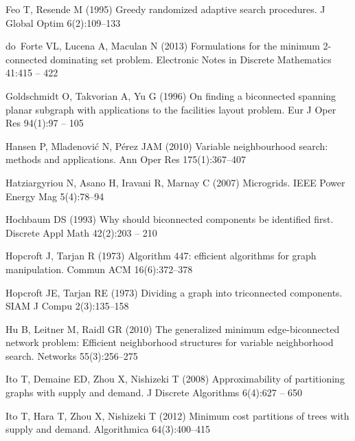 \begin{thebibliography}{38}
Feo T, Resende M (1995) Greedy randomized adaptive search procedures. J Global
  Optim 6(2):109--133

do~Forte VL, Lucena A, Maculan N (2013) Formulations for the minimum
  2-connected dominating set problem. Electronic Notes in Discrete Mathematics
  41:415 -- 422

Goldschmidt O, Takvorian A, Yu G (1996) On finding a biconnected spanning
  planar subgraph with applications to the facilities layout problem. Eur J
  Oper Res 94(1):97 -- 105

Hansen P, Mladenovi{\'c} N, P{\'e}rez JAM (2010) Variable neighbourhood search:
  methods and applications. Ann Oper Res 175(1):367--407

Hatziargyriou N, Asano H, Iravani R, Marnay C (2007) Microgrids. IEEE Power
  Energy Mag 5(4):78--94

Hochbaum DS (1993) Why should biconnected components be identified first.
  Discrete Appl Math 42(2):203 -- 210

Hopcroft J, Tarjan R (1973{}) Algorithm 447: efficient algorithms
  for graph manipulation. Commun ACM 16(6):372--378

Hopcroft JE, Tarjan RE (1973{}) Dividing a graph into triconnected
  components. SIAM J Compu 2(3):135--158

Hu B, Leitner M, Raidl GR (2010) The generalized minimum edge-biconnected
  network problem: Efficient neighborhood structures for variable neighborhood
  search. Networks 55(3):256--275

Ito T, Demaine ED, Zhou X, Nishizeki T (2008) Approximability of partitioning
  graphs with supply and demand. J Discrete Algorithms 6(4):627 -- 650

Ito T, Hara T, Zhou X, Nishizeki T (2012) Minimum cost partitions of trees with
  supply and demand. Algorithmica 64(3):400--415


\end{thebibliography}
